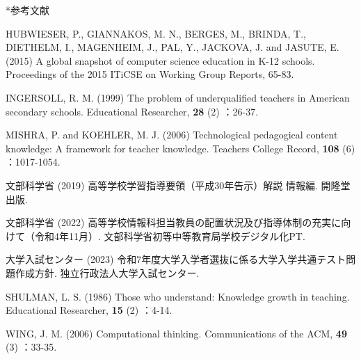 \documentclass[a4paper,10pt,twocolumn]{ltjsarticle}
\makeatletter
\renewcommand{\section}{\@startsection{section}{1}{\z@}{1.1\Cvs \@plus.4\Cdp \@minus.2\Cdp}{.5\Cvs \@plus.2\Cdp}{\normalfont\gtfamily\bfseries\large}}
\makeatother
\begin{document}
\section*{参考文献}
\begingroup\scriptsize\raggedright{} 
\begin{list}{}{\setlength{\leftmargin}{1.5\zw}\setlength{\itemindent}{-1.5\zw}\setlength{\labelwidth}{0pt}\setlength{\labelsep}{0pt}\setlength{\itemsep}{1pt}\setlength{\parsep}{0pt}\setlength{\topsep}{0pt}\setlength{\listparindent}{0pt}}
\item HUBWIESER, P., GIANNAKOS, M. N., BERGES, M., BRINDA, T., DIETHELM, I., MAGENHEIM, J., PAL, Y., JACKOVA, J. and JASUTE, E. (2015) A global snapshot of computer science education in K-12 schools. Proceedings of the 2015 ITiCSE on Working Group Reports, 65-83.
\item INGERSOLL, R. M. (1999) The problem of underqualified teachers in American secondary schools. Educational Researcher, \textbf{28} (2) ：26-37.
\item MISHRA, P. and KOEHLER, M. J. (2006) Technological pedagogical content knowledge: A framework for teacher knowledge. Teachers College Record, \textbf{108} (6) ：1017-1054.
\item 文部科学省 (2019) 高等学校学習指導要領（平成30年告示）解説 情報編. 開隆堂出版.
\item 文部科学省 (2022) 高等学校情報科担当教員の配置状況及び指導体制の充実に向けて（令和4年11月）. 文部科学省初等中等教育局学校デジタル化PT.
\item 大学入試センター (2023) 令和7年度大学入学者選抜に係る大学入学共通テスト問題作成方針. 独立行政法人大学入試センター.
\item SHULMAN, L. S. (1986) Those who understand: Knowledge growth in teaching. Educational Researcher, \textbf{15} (2) ：4-14.
\item WING, J. M. (2006) Computational thinking. Communications of the ACM, \textbf{49} (3) ：33-35.
\end{list}\endgroup
\end{document}

